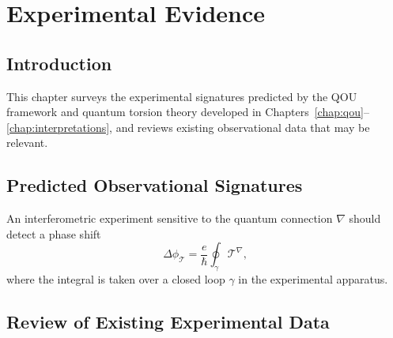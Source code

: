 \chapter{Experimental Evidence}
\label{chap:experimental}

\section{Introduction}
\label{sec:exp-intro}

This chapter surveys the experimental signatures predicted by the QOU
framework and quantum torsion theory developed in
Chapters~\ref{chap:qou}--\ref{chap:interpretations}, and reviews existing
observational data that may be relevant.

\section{Predicted Observational Signatures}
\label{sec:exp-signatures}


\begin{conjecture}
  \label{conj:phase-shift}
  An interferometric experiment sensitive to the quantum connection
  $\nabla$ should detect a phase shift
  \begin{equation}
    \Delta\phi_{\mathcal{T}}
    = \frac{e}{\hbar} \oint_\gamma \mathcal{T}^\nabla,
    \label{eq:phase-shift}
  \end{equation}
  where the integral is taken over a closed loop $\gamma$ in the
  experimental apparatus.
\end{conjecture}

\section{Review of Existing Experimental Data}
\label{sec:exp-existing}


